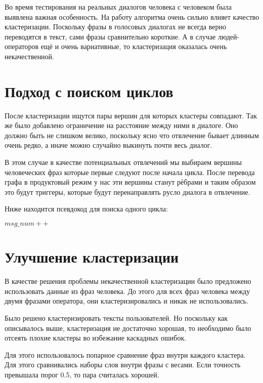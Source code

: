 \documentclass[specification,annotation]{itmo-student-thesis}
\begin{document}
	Во время тестирования на реальных диалогов человека с человеком была выявлена важная особенность. На работу алгоритма очень сильно влияет качество кластеризации. Поскольку фразы в голосовых диалогах не всегда верно переводятся в текст, сами фразы сравнительно короткие. А в случае людей-операторов ещё и очень вариативные, то кластеризация оказалась очень некачественной.
	
	\section{Подход с поиском циклов}
	После кластеризации ищутся пары вершин для которых кластеры совпадают. Так же было добавлено ограничение на расстояние между ними в диалоге. Оно должно быть не слишком велико, поскольку ясно что отвлечение бывает длинным очень редко, а иначе можно случайно выкинуть почти весь диалог.
	
	В этом случае в качестве потенциальных отвлечений мы выбираем вершины человеческих фраз которые первые следуют после начала цикла. После перевода графа в продуктовый режим у нас эти вершины станут рёбрами и таким образом это будут триггеры, которые будут перенаправлять русло диалога в отвлечение.
	
	Ниже находится псевдокод для поиска одного цикла:
	
	\begin{algorithmic}
		\State $msg\_num++$
		\EndIf
		\EndFor
		\EndFunction
	\end{algorithmic}
	
	
	\section{Улучшение кластеризации}
	В качестве решения проблемы некачественной кластеризации было предложено использовать данные из фраз человека. До этого для всех фраз человека между двумя фразами оператора, они кластеризировались и никак не использовались. 
	
	Было решено кластеризировать тексты пользователей. Но поскольку как описывалось выше, кластеризация не достаточно хорошая, то необходимо было отсеять плохие кластеры во избежание каскадных ошибок.
	
	Для этого использовалось попарное сравнение фраз внутри каждого кластера. Для этого сравнивались наборы слов внутри фразы с весами. Если точность превышала порог 0.5, то пара считалась хорошей.
	
\end{document}
